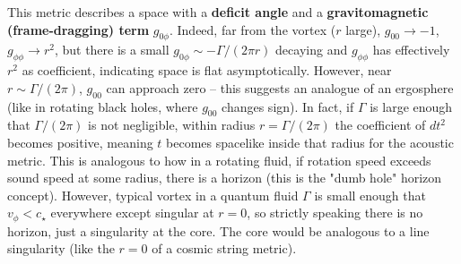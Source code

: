 \documentclass[12pt]{article}
\begin{document}
This metric describes a space with a \textbf{deficit angle} and a \textbf{gravitomagnetic (frame-dragging) term} $g_{0\phi}$. Indeed, far from the vortex ($r$ large), $g_{00}\to -1$, $g_{\phi\phi} \to r^2$, but there is a small $g_{0\phi} \sim -\Gamma/(2\pi r)$ decaying and $g_{\phi\phi}$ has effectively $r^2$ as coefficient, indicating space is flat asymptotically. However, near $r \sim \Gamma/(2\pi)$, $g_{00}$ can approach zero – this suggests an analogue of an ergosphere (like in rotating black holes, where $g_{00}$ changes sign). In fact, if $\Gamma$ is large enough that $\Gamma/(2\pi)$ is not negligible, within radius $r = \Gamma/(2\pi)$ the coefficient of $dt^2$ becomes positive, meaning $t$ becomes spacelike inside that radius for the acoustic metric. This is analogous to how in a rotating fluid, if rotation speed exceeds sound speed at some radius, there is a horizon (this is the "dumb hole" horizon concept). However, typical vortex in a quantum fluid $\Gamma$ is small enough that $v_\phi < c_\star$ everywhere except singular at $r=0$, so strictly speaking there is no horizon, just a singularity at the core. The core would be analogous to a line singularity (like the $r=0$ of a cosmic string metric).
\end{document}
